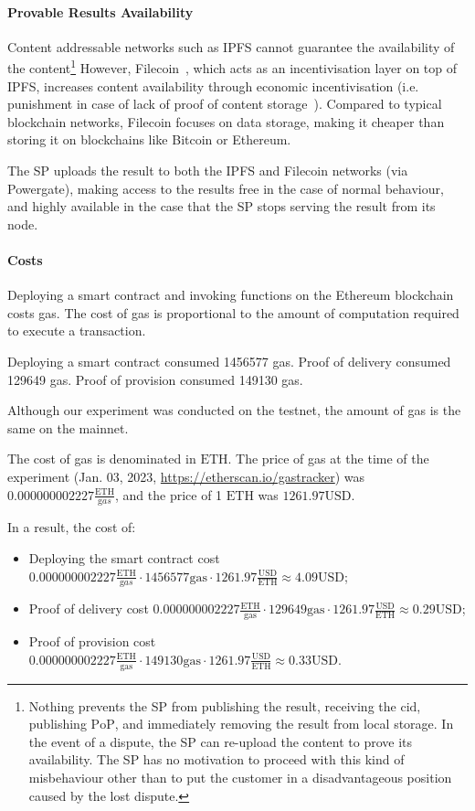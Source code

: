 \documentclass[pdftex,twocolumn,epjc3]{svjour3}
\begin{document}
{\paragraph{Provable Results Availability}\label{sec:provable-results-availability}
Content addressable networks such as IPFS cannot guarantee the availability of the content\footnote{Nothing prevents the SP from publishing the result, receiving the $\mathrm{cid}$, publishing $\mathrm{PoP}$, and immediately removing the result from local storage. In the event of a dispute, the SP can re-upload the content to prove its availability. The SP has no motivation to proceed with this kind of misbehaviour other than to put the customer in a disadvantageous position caused by the lost dispute.} However, Filecoin~\cite{protocollabsFilecoinDecentralizedStorage2017}, which acts as an incentivisation layer on top of IPFS, increases content availability through economic incentivisation (i.e. punishment in case of lack of proof of content storage~\cite{filecoinSlashing}). Compared to typical blockchain networks, Filecoin focuses on data storage, making it cheaper than storing it on blockchains like Bitcoin or Ethereum.

The SP uploads the result to both the IPFS and Filecoin networks (via Powergate), making access to the results free in the case of normal behaviour, and highly available in the case that the SP stops serving the result from its node. 

\paragraph{Costs}
Deploying a smart contract and invoking functions on the Ethereum blockchain costs gas. The cost of gas is proportional to the amount of computation required to execute a transaction. 

Deploying a smart contract consumed 1456577 gas.
Proof of delivery consumed 129649 gas.
Proof of provision consumed 149130 gas.

Although our experiment was conducted on the testnet, the amount of gas is the same on the mainnet.

The cost of gas is denominated in $\mathrm{ETH}$. The price of gas at the time of the experiment (Jan. 03, 2023, \url{https://etherscan.io/gastracker}) was $0.000000002227 \frac{\mathrm{ETH}}{\mathrm gas}$, and the price of 1 $\mathrm{ETH}$ was $1261.97 \mathrm{USD}$.

In a result, the cost of:
\begin{itemize}
  \item Deploying the smart contract cost $0.000000002227 \frac{\mathrm{ETH}}{\mathrm gas} \cdot 1456577 \mathrm{gas} \cdot 1261.97 \frac{\mathrm{USD}}{\mathrm{ETH}} \approx 4.09 \mathrm{USD}$; 
  \item Proof of delivery cost $0.000000002227 \mathrm{\frac{ETH}{gas}} \cdot 129649 \mathrm{gas} \cdot 1261.97 \frac{\mathrm{USD}}{\mathrm{ETH}} \approx 0.29 \mathrm{USD}$; 
  \item Proof of provision cost $0.000000002227 \mathrm{\frac{ETH}{gas}} \cdot 149130 \mathrm{gas} \cdot 1261.97 \frac{\mathrm{USD}}{\mathrm{ETH}} \approx 0.33 \mathrm{USD}$.
\end{itemize}


}
\end{document}
